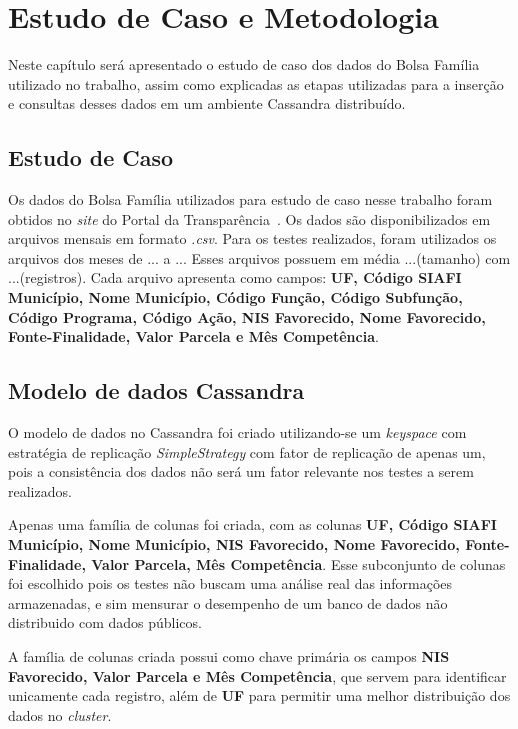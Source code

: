 

\chapter{Estudo de Caso e Metodologia}

Neste capítulo será apresentado o estudo de caso dos dados do Bolsa Família utilizado no trabalho, assim como explicadas as etapas utilizadas para a inserção e consultas desses dados em um ambiente Cassandra distribuído.

\section{Estudo de Caso}
Os dados do Bolsa Família utilizados para estudo de caso nesse trabalho foram obtidos no \emph{site} do Portal da Transparência~\cite{portaltransparencia}. Os dados são disponibilizados em arquivos mensais em formato \emph{.csv}. Para os testes realizados, foram utilizados os arquivos dos meses de ... a ... Esses arquivos possuem em média ...(tamanho) com ...(registros). Cada arquivo apresenta como campos: \textbf{UF, Código SIAFI Município, Nome Município, Código Função, Código Subfunção, Código Programa, Código Ação, NIS Favorecido, Nome Favorecido, Fonte-Finalidade, Valor Parcela e Mês Competência}. 


\section{Modelo de dados Cassandra}
O modelo de dados no Cassandra foi criado utilizando-se um \emph{keyspace} com estratégia de replicação \emph{SimpleStrategy} com fator de replicação de apenas um, pois a consistência dos dados não será um fator relevante nos testes a serem realizados.

Apenas uma família de colunas foi criada, com as colunas \textbf{UF, Código SIAFI Município, Nome Município, NIS Favorecido, Nome Favorecido, Fonte-Finalidade, Valor Parcela, Mês Competência}. Esse subconjunto de colunas foi escolhido pois os testes não buscam uma análise real das informações armazenadas, e sim mensurar o desempenho de um banco de dados não distribuido com dados públicos.

A família de colunas criada possui como chave primária os campos \textbf{NIS Favorecido, Valor Parcela e Mês Competência}, que servem para identificar unicamente cada registro, além de \textbf{UF} para permitir uma melhor distribuição dos dados no \emph{cluster}.

